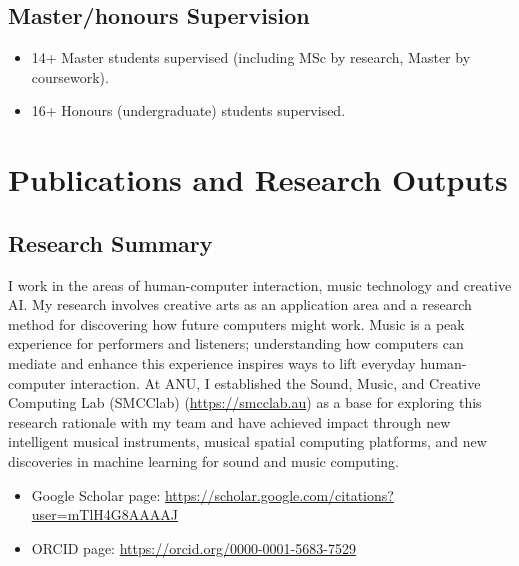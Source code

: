 \documentclass[11pt, a4paper, oneside]{article}
\begin{document}
\subsection*{Master/honours Supervision}

\begin{itemize}

\item 14+ Master students supervised (including MSc by research, Master by coursework).

\item 16+ Honours (undergraduate) students supervised.

\end{itemize}

\pagebreak
\section{Publications and Research Outputs}
\label{publications}

\subsection{Research Summary}

I work in the areas of human-computer interaction, music technology and creative AI.  
My research involves creative arts as an application area and a research method for discovering how future computers might work. 
Music is a peak experience for performers and listeners; understanding how computers can mediate and enhance this experience inspires ways to lift everyday human-computer interaction. 
At ANU, I established the Sound, Music, and Creative Computing Lab (SMCClab) (\url{https://smcclab.au}) as a base for exploring this research rationale with my team and have achieved impact through new intelligent musical instruments, musical spatial computing platforms, and new discoveries in machine learning for sound and music computing. 

\begin{itemize}
  \item Google Scholar page: \url{https://scholar.google.com/citations?user=mTlH4G8AAAAJ}
  \item ORCID page: \url{https://orcid.org/0000-0001-5683-7529}
\end{itemize}
\end{document}

